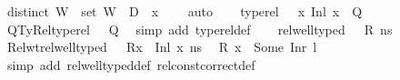 \begin{isabellebody}
\ {\isachardoublequoteopen}distinct\ W{\isachardoublequoteclose}\ \ {\isachardoublequoteopen}set\ W\ {\isasyminter}\ {\isacharparenleft}{\kern0pt}D{}\ {\isasymunion}\ {\isacharbraceleft}{\kern0pt}x{}{\isacharbraceright}{\kern0pt}{\isacharparenright}{\kern0pt}\ {\isacharequal}{\kern0pt}\ {\isacharbraceleft}{\kern0pt}{\isacharbraceright}{\kern0pt}{\isachardoublequoteclose}\ \isamarkupfalse%
\ auto\isanewline
\ \ \isamarkupfalse%
\ {\isacartoucheopen}type{\isacharunderscore}{\kern0pt}rel\ {\isasymLambda}\ {\isasymLambda}{\isacharprime}{\kern0pt}\ {\isacharparenleft}{\kern0pt}{\isacharparenleft}{\kern0pt}x{\isacharcomma}{\kern0pt}\ {\isacharparenleft}{\kern0pt}Inl\ x{}{\isacharparenright}{\kern0pt}{\isacharparenright}{\kern0pt}\ {\isacharhash}{\kern0pt}\ Q{\isacharparenright}{\kern0pt}{\isacartoucheclose}\ \isamarkupfalse%
\ QTyRel{\isacharcolon}{\kern0pt}{\isachardoublequoteopen}type{\isacharunderscore}{\kern0pt}rel\ {\isasymLambda}\ {\isasymLambda}{\isacharprime}{\kern0pt}\ Q{\isachardoublequoteclose}\ \isamarkupfalse%
\ {\isacharparenleft}{\kern0pt}simp\ add{\isacharcolon}{\kern0pt}\ type{\isacharunderscore}{\kern0pt}rel{\isacharunderscore}{\kern0pt}def{\isacharparenright}{\kern0pt}\isanewline
\ \ \isamarkupfalse%
\ {\isacartoucheopen}rel{\isacharunderscore}{\kern0pt}well{\isacharunderscore}{\kern0pt}typed\ {\isasymLambda}\ {\isasymOmega}\ R\ ns{\isacartoucheclose}\ \isamarkupfalse%
\ Rel{\isacharunderscore}{\kern0pt}wt{\isacharcolon}{\kern0pt}{\isacartoucheopen}rel{\isacharunderscore}{\kern0pt}well{\isacharunderscore}{\kern0pt}typed\ {\isasymLambda}\ {\isasymOmega}\ {\isacharparenleft}{\kern0pt}R{\isacharparenleft}{\kern0pt}x\ {\isasymmapsto}\ {\isacharparenleft}{\kern0pt}Inl\ x{}{\isacharparenright}{\kern0pt}{\isacharparenright}{\kern0pt}{\isacharparenright}{\kern0pt}\ ns{\isacartoucheclose}\ \isamarkupfalse%
\ {\isacartoucheopen}R\ x\ {\isacharequal}{\kern0pt}\ Some\ {\isacharparenleft}{\kern0pt}Inr\ l{\isacharparenright}{\kern0pt}{\isacartoucheclose}\ \isamarkupfalse%
\ {\isacharparenleft}{\kern0pt}simp\ add{\isacharcolon}{\kern0pt}\ rel{\isacharunderscore}{\kern0pt}well{\isacharunderscore}{\kern0pt}typed{\isacharunderscore}{\kern0pt}def\ rel{\isacharunderscore}{\kern0pt}const{\isacharunderscore}{\kern0pt}correct{\isacharunderscore}{\kern0pt}def{\isacharparenright}{\kern0pt}\isanewline
\ \ \isamarkupfalse%

\end{isabellebody}
